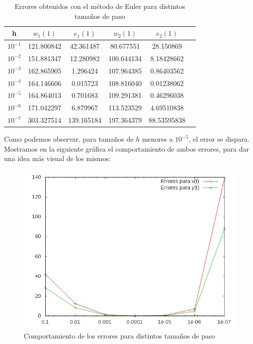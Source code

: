 \documentclass[12pt]{article}       %
\begin{document}
    \begin{table}[H]
        \centering
        \setlength\extrarowheight{2.5pt}
        
        \begin{tabular}{|c|c|c|c|c|c}
            \hline
            \textbf{h} & {\textbf{$w_1(1)$}} & \textbf{$e_1(1)$} & {\textbf{$w_2(1)$}} & \textbf{$e_2(1)$} \\ 
            \hline
                $10^{-1}$ & 121.800842 & 42.361487 & 80.677551 & 28.150869 \\
            \hline
                $10^{-2}$ & 151.881347 & 12.280982 & 100.644134 & 8.18428662 \\
            \hline 
                $10^{-3}$ & 162.865905 & 1.296424 & 107.964385 & 0.86403562 \\ 
            \hline
                $10^{-4}$ & 164.146606 & 0.015723 & 108.816040 & 0.01238062 \\
            \hline
                $10^{-5}$ & 164.864013 & 0.701683 & 109.291381 & 0.46296038 \\
            \hline
                $10^{-6}$ & 171.042297 & 6.879967 & 113.523529 & 4.69510838 \\
            \hline
                $10^{-7}$ & 303.327514 & 139.165184 & 197.364379 & 88.53595838 \\
            \hline 
        \end{tabular}
        
        \caption{Errores obtenidos con el método de Euler para distintos tamaños de paso}           
    \end{table}
    
Como podemos observar, para tamaños de $h$ menores a $10^{-5}$, el error se dispara. Mostramos en la siguiente gráfica el comportamiento de ambos errores, para dar una idea más visual de los mismos:

\begin{figure}[H]
    \centering
    \includegraphics[scale=0.5]{img/graph_error_comb}
    \caption{Comportamiento de los errores para distintos tamaños de paso}
    \label{fig:graph_error_comb}
\end{figure}
\end{document}
